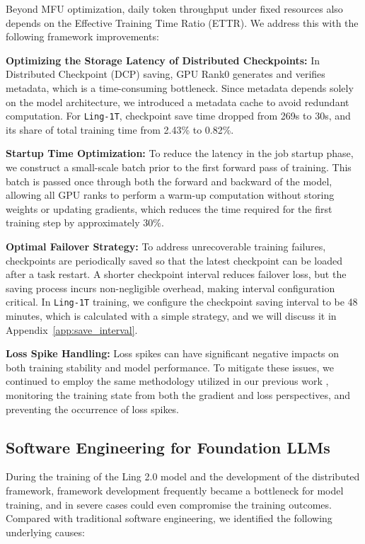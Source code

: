 Beyond MFU optimization, daily token throughput under fixed resources also depends on the Effective Training Time Ratio (ETTR). We address this with the following framework improvements:

\textbf{Optimizing the Storage Latency of Distributed Checkpoints:} 
In Distributed Checkpoint (DCP) saving, GPU Rank0 generates and verifies metadata, which is a time-consuming bottleneck. Since metadata depends solely on the model architecture, we introduced a metadata cache to avoid redundant computation.
For \texttt{Ling-1T}, checkpoint save time dropped from 269s to 30s, and its share of total training time from 2.43\% to 0.82\%.


\textbf{Startup Time Optimization:} To reduce the latency in the job startup phase, we construct a small-scale batch prior to the first forward pass of training.
This batch is passed once through both the forward and backward of the model, allowing all GPU ranks to perform a warm-up computation without storing weights or updating gradients, which reduces the time required for the first training step by approximately 30\%.

\textbf{Optimal Failover Strategy:} To address unrecoverable training failures, checkpoints are periodically saved so that the latest checkpoint can be loaded after a task restart.
A shorter checkpoint interval reduces failover loss, but the saving process incurs non-negligible overhead, making interval configuration critical.
In \texttt{Ling-1T} training, we configure the checkpoint saving interval to be 48 minutes, which is calculated with a simple strategy, and we will discuss it in Appendix~\ref{app:save_interval}.

\textbf{Loss Spike Handling:} Loss spikes can have significant negative impacts on both training stability and model performance. To mitigate these issues, we continued to employ the same methodology utilized in our previous work \citep{team2025every}, monitoring the training state from both the gradient and loss perspectives, and preventing the occurrence of loss spikes.









\subsection{Software Engineering for Foundation LLMs}

During the training of the Ling 2.0 model and the development of the distributed framework, framework development frequently became a bottleneck for model training, and in severe cases could even compromise the training outcomes. Compared with traditional software engineering, we identified the following underlying causes:

